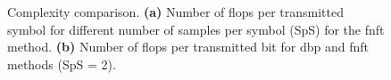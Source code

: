 \begin{figure}[htbp]
\begin{minipage}[h]{.49\linewidth}
\end{minipage}
\begin{minipage}[h]{.49\linewidth}
\end{minipage}
	\caption{Complexity comparison. \textbf{(a)} Number of \acrshort{flop}s per transmitted symbol for different number of samples per symbol (SpS) for the \acrshort{fnft} method. \textbf{(b)} Number of \acrshort{flop}s per transmitted bit for \acrshort{dbp} and \acrshort{fnft} methods (SpS = 2).}
	\label{fig:complexity}
\end{figure}


